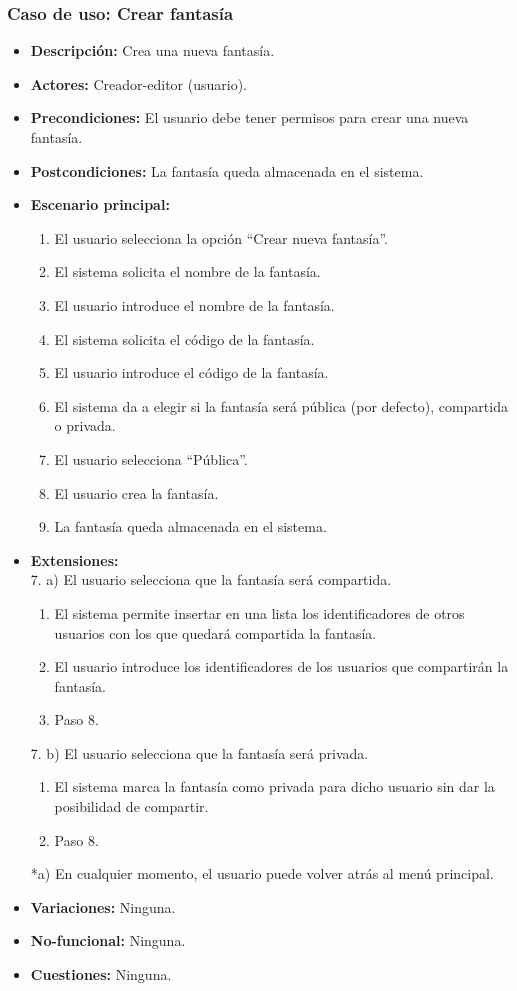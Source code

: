 \subsubsection{Caso de uso: Crear fantasía}
\begin{itemize}
	\item \textbf{Descripción:} Crea una nueva fantasía.
	\item \textbf{Actores:} Creador-editor (usuario).
	\item \textbf{Precondiciones:} El usuario debe tener permisos para crear una nueva fantasía.
	\item \textbf{Postcondiciones:} La fantasía queda almacenada en el sistema.
	\item \textbf{Escenario principal:}
	\begin{enumerate}
		\item El usuario selecciona la opción ``Crear nueva fantasía''.
		\item El sistema solicita el nombre de la fantasía.
		\item El usuario introduce el nombre de la fantasía.
		\item El sistema solicita el código de la fantasía.
		\item El usuario introduce el código de la fantasía.
		\item El sistema da a elegir si la fantasía será pública (por defecto), compartida o privada.
		\item El usuario selecciona ``Pública''.
		\item El usuario crea la fantasía.
		\item La fantasía queda almacenada en el sistema.
	\end{enumerate}
	\item \textbf{Extensiones:} \\7. a) El usuario selecciona que la fantasía será compartida.
	\begin{enumerate}
		\item El sistema permite insertar en una lista los identificadores de otros usuarios con los que quedará compartida la fantasía.
		\item El usuario introduce los identificadores de los usuarios que compartirán la fantasía.
		\item Paso 8.
	\end{enumerate}
	7. b) El usuario selecciona que la fantasía será privada.
	\begin{enumerate}
		\item El sistema marca la fantasía como privada para dicho usuario sin dar la posibilidad de compartir.
		\item Paso 8.
	\end{enumerate}
	*a) En cualquier momento, el usuario puede volver atrás al menú principal.
	\item \textbf{Variaciones:} Ninguna.
	\item \textbf{No-funcional:} Ninguna.
	\item \textbf{Cuestiones:} Ninguna.
\end{itemize}

